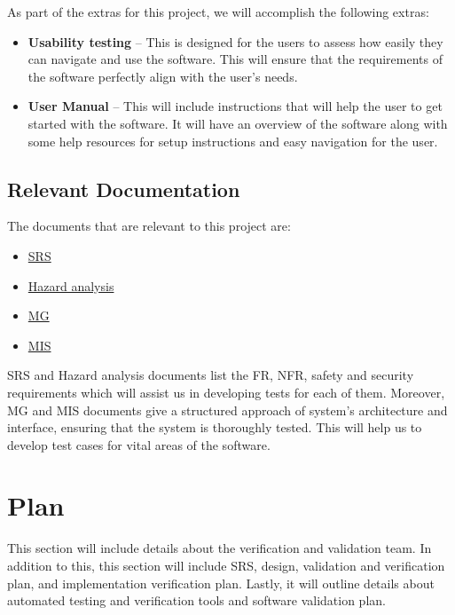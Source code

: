 \documentclass[12pt, titlepage]{article}
\begin{document}
As part of the extras for this project, we will accomplish the following extras:

\begin{itemize}
  \item \textbf{Usability testing} -- This is designed for the users to assess how easily they can navigate and use the software. This will ensure that the requirements of the software perfectly align with the user's needs.
  \item \textbf{User Manual} -- This will include instructions that will help the user to get started with the software. It will have an overview of the software along with some help resources for setup instructions and easy navigation for the user.
\end{itemize}

\subsection{Relevant Documentation} \label{section:2.4}

The documents that are relevant to this project are:
\begin{itemize}
  \item \href{https://github.com/Inreet-Kaur/capstone/blob/main/docs/SRS/SRS.pdf}{SRS} 
  \item \href{https://github.com/Inreet-Kaur/capstone/blob/main/docs/HazardAnalysis/HazardAnalysis.pdf}{Hazard analysis}
  \item \href{https://github.com/PKALXI/RapidCare/blob/main/docs/Design/SoftArchitecture/MG.pdf}{MG}
  \item \href{https://github.com/PKALXI/RapidCare/blob/main/docs/Design/SoftDetailedDes/MIS.pdf}{MIS}
\end{itemize}
SRS and Hazard analysis documents list the FR, NFR, safety and security requirements which will assist us in developing tests for each of them. Moreover, MG and MIS documents give a structured approach of system's architecture and interface, ensuring that the system is thoroughly tested. This will help us to develop test cases for vital areas of the software.  


\section{Plan} \label{section:3}

This section will include details about the verification and validation team. In addition to this, this section will include SRS, design, validation and verification plan, and implementation verification plan. Lastly, it will outline details about automated testing and verification tools and software validation plan.
\end{document}

